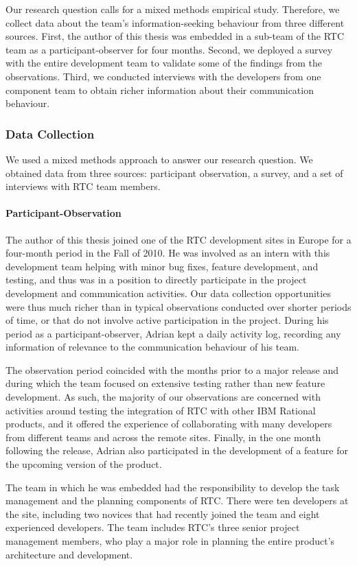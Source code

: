 Our research question calls for a mixed methods empirical study. Therefore, we collect data about the team's information-seeking behaviour from three different sources.
First, the author of this thesis was embedded in a sub-team of the RTC team as a participant-observer for four months.
Second, we deployed a survey with the entire development team to validate some of the findings from the observations.
Third, we conducted interviews with the developers from one component team to obtain richer information about their communication behaviour.


\subsubsection{Data Collection}
We used a mixed methods approach to answer our research question. We obtained data from three sources: participant observation, a survey, and a set of interviews with RTC team members.

\paragraph{Participant-Observation}
The  author of this thesis joined one of the RTC development sites in Europe for a four-month period in the Fall of 2010. He was involved as an intern with this development team helping with minor bug fixes, feature development, and testing, and thus was in a position to directly participate in the project development and communication activities. Our data collection opportunities were thus much richer than in typical observations conducted over shorter periods of time, or that do not involve active participation in the project.  During his period as a participant-observer, Adrian kept a daily activity log, recording any information of relevance to the communication behaviour of his team.

The observation period coincided with the months prior to a major release and during which the team focused on extensive testing rather than new feature development. As such, the majority of our observations are concerned with activities around testing the integration of RTC with other IBM Rational products, and it offered the experience of collaborating with many developers from different teams and across the remote sites. Finally, in the one month following the release, Adrian also participated in the development of a feature for the upcoming version of the product.

The team in which he was embedded had the responsibility to develop the task management and the planning components of RTC. There were ten developers at the site, including two novices that had recently joined the team and eight experienced developers. The team includes RTC's three senior project management members, who play a major role in planning the entire product's architecture and development.


